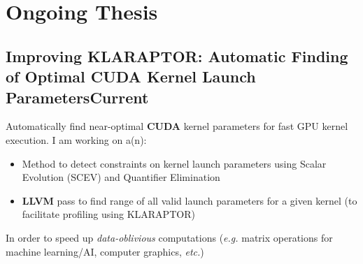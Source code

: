 \documentclass[9pt]{article}
\begin{document}


\section*{Ongoing Thesis}

\subsection{Improving KLARAPTOR: Automatic Finding of Optimal CUDA Kernel Launch Parameters\hfill \normalsize\textnormal{Current}}
Automatically find near-optimal \textbf{CUDA} kernel parameters for fast GPU kernel execution. I am working on a(n):
\vspace{-0.5em}
\begin{itemize}
  \item Method to detect constraints on kernel launch parameters using Scalar Evolution (SCEV) and Quantifier Elimination

  \item \textbf{LLVM} pass to find range of all valid launch parameters for a given kernel (to facilitate profiling using KLARAPTOR)
\end{itemize}
\vspace{-0.5em}
In order to speed up \textit{data-oblivious} computations (\textit{e.g.} matrix operations for machine learning/AI, computer graphics, \textit{etc.})
\end{document}
